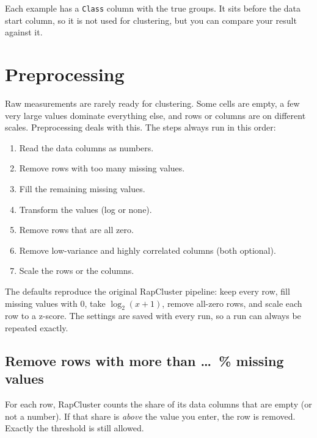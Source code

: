 \documentclass[11pt,a4paper]{article}
\begin{document}
Each example has a \texttt{Class} column with the true groups. It sits before the data start column, so it is not
used for clustering, but you can compare your result against it.

\section{Preprocessing}
\label{sec:preprocessing}

Raw measurements are rarely ready for clustering. Some cells are empty, a few very large values dominate everything
else, and rows or columns are on different scales. Preprocessing deals with this. The steps always run in this
order:

\begin{enumerate}
  \item Read the data columns as numbers.
  \item Remove rows with too many missing values.
  \item Fill the remaining missing values.
  \item Transform the values (log or none).
  \item Remove rows that are all zero.
  \item Remove low-variance and highly correlated columns (both optional).
  \item Scale the rows or the columns.
\end{enumerate}

The defaults reproduce the original RapCluster pipeline: keep every row, fill missing values with 0, take
$\log_2(x+1)$, remove all-zero rows, and scale each row to a z-score. The settings are saved with every run, so a run
can always be repeated exactly.

\subsection{Remove rows with more than \dots\ \% missing values}

For each row, RapCluster counts the share of its data columns that are empty (or not a number). If that share is
\emph{above} the value you enter, the row is removed. Exactly the threshold is still allowed.
\end{document}
